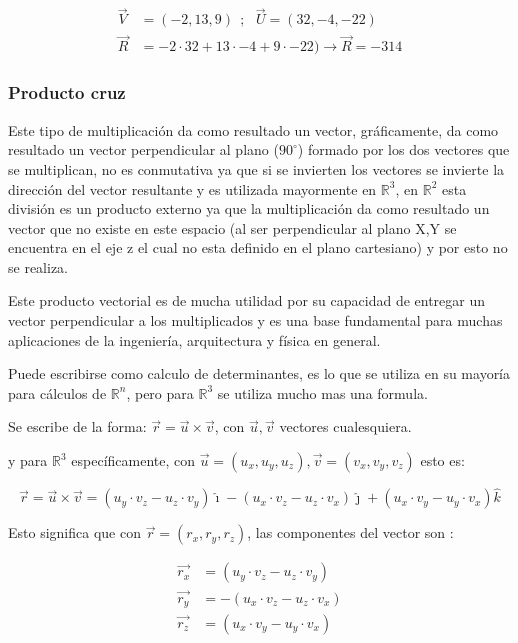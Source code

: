     \begin{align*}
        \vec{V}& =(-2,13,9)  \ \ ;\ \ \   \vec{U} =(32,-4,-22)		\\
        \vec{R}&= -2\cdot32 + 13\cdot-4 +9\cdot-22 )  \rightarrow \vec{R} = -314
    \end{align*}

    \subsubsection{Producto cruz}

    Este tipo de multiplicación da como resultado un vector, gráficamente, da
    como resultado un vector perpendicular al plano ($90^\circ$) formado por
    los dos vectores
    que se multiplican, no es conmutativa ya que si se invierten los vectores
    se invierte la dirección del vector resultante y es utilizada mayormente en
    $\mathbb{R}^3$, en $\mathbb{R}^2$ esta división es un producto externo ya
    que la multiplicación da como resultado un vector que no existe en este espacio
    (al ser perpendicular al plano X,Y se encuentra en el eje z el cual no esta
    definido en el plano cartesiano) y por esto no se realiza.

    Este producto vectorial es de mucha utilidad por su capacidad de entregar
    un vector perpendicular a los multiplicados y es una base fundamental para
    muchas aplicaciones de la ingeniería, arquitectura y física en general.

    Puede escribirse como calculo de determinantes, es lo que se utiliza en su
    mayoría para cálculos de $\mathbb{R}^n$, pero para $\mathbb{R}^3$ se utiliza
    mucho mas una formula.

    Se escribe de la forma: $\vec{r} = \vec{u}\times\vec{v}$, con
    $\vec{u},\vec{v}$ vectores cualesquiera.

    y para $\mathbb{R}^3$ específicamente, con $\vec{u}=(u_x,u_y,u_z),
    \vec{v}=(v_x,v_y,v_z)$ esto es:

    $$\vec{r} = \vec{u}\times\vec{v} =
        (u_y\cdot v_z- u_z\cdot v_y)\hat{\imath}
        - (u_x\cdot v_z- u_z\cdot v_x)\hat{\jmath}
        +  (u_x\cdot v_y- u_y\cdot v_x)\hat{k}
    $$

    Esto significa que con $\vec{r} = (r_x,r_y,r_z)$, las componentes del vector
    son :

    \begin{align*}
        \vec{r_x}& = (u_y\cdot v_z- u_z\cdot v_y)\\
        \vec{r_y}&= -(u_x\cdot v_z- u_z\cdot v_x)\\
        \vec{r_z}&= (u_x\cdot v_y- u_y\cdot v_x)
    \end{align*}

